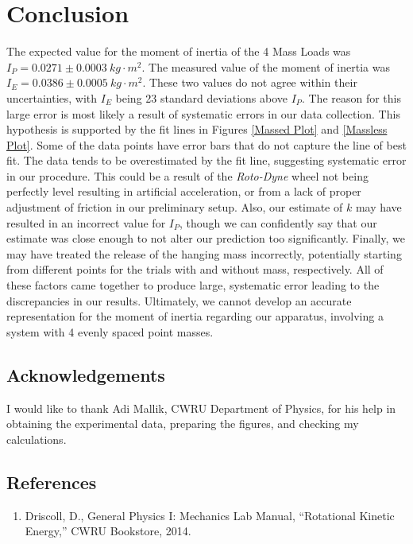 \documentclass[12pt]{article}
\begin{document}
\section{Conclusion}
The expected value for the moment of inertia of the 4 Mass Loads was $I_P=0.0271\pm0.0003\ kg\cdot m^2$. The measured value of the moment of inertia was $I_E=0.0386\pm0.0005\ kg\cdot m^2$. These two values do not agree within their uncertainties, with $I_E$ being 23 standard deviations above $I_P$. The reason for this large error is most likely a result of systematic errors in our data collection. This hypothesis is supported by the fit lines in Figures \ref{Massed Plot} and \ref{Massless Plot}. Some of the data points have error bars that do not capture the line of best fit. The data tends to be overestimated by the fit line, suggesting systematic error in our procedure. This could be a result of the \textit{Roto-Dyne} wheel not being perfectly level resulting in artificial acceleration, or from a lack of proper adjustment of friction in our preliminary setup. Also, our estimate of $k$ may have resulted in an incorrect value for $I_P$, though we can confidently say that our estimate was close enough to not alter our prediction too significantly. Finally, we may have treated the release of the hanging mass incorrectly, potentially starting from different points for the trials with and without mass, respectively. All of these factors came together to produce large, systematic error leading to the discrepancies in our results. Ultimately, we cannot develop an accurate representation for the moment of inertia regarding our apparatus, involving a system with 4 evenly spaced point masses.

\subsection{Acknowledgements}
I would like to thank Adi Mallik, CWRU Department of Physics, for his help in obtaining the experimental data, preparing the figures, and checking my calculations.

\subsection{References}
\begin{enumerate}
    \item Driscoll, D., General Physics I: Mechanics Lab Manual, “Rotational Kinetic Energy,” CWRU Bookstore, 2014.
\end{enumerate}
\end{document}
